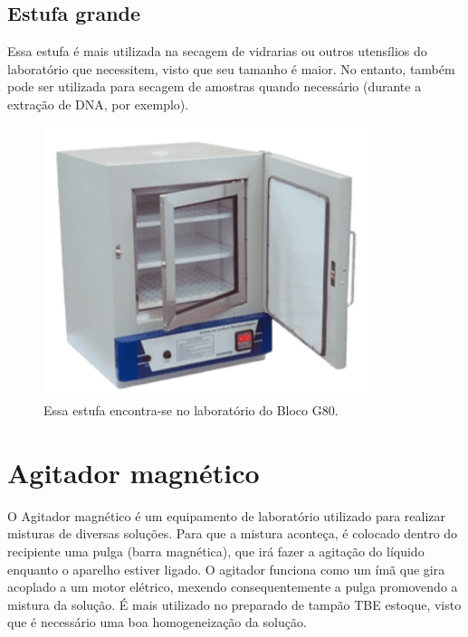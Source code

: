 \documentclass[
  letterpaper,
  DIV=11,
  numbers=noendperiod]{scrreprt}
\begin{document}
\hypertarget{estufa-grande}{%
\subsection{Estufa grande}\label{estufa-grande}}

Essa estufa é mais utilizada na secagem de vidrarias ou outros
utensílios do laboratório que necessitem, visto que seu tamanho é maior.
No entanto, também pode ser utilizada para secagem de amostras quando
necessário (durante a extração de DNA, por exemplo).

\begin{figure}

{\centering \includegraphics[width=\textwidth,height=3.125in]{figures/equipamentos/estufa_grande.png}

}

\caption{Essa estufa encontra-se no laboratório do Bloco G80.}

\end{figure}

\hypertarget{agitador-magnuxe9tico}{%
\section{Agitador magnético}\label{agitador-magnuxe9tico}}

O Agitador magnético é um equipamento de laboratório utilizado para
realizar misturas de diversas soluções. Para que a mistura aconteça, é
colocado dentro do recipiente uma pulga (barra magnética), que irá fazer
a agitação do líquido enquanto o aparelho estiver ligado. O agitador
funciona como um ímã que gira acoplado a um motor elétrico, mexendo
consequentemente a pulga promovendo a mistura da solução. É mais
utilizado no preparado de tampão TBE estoque, visto que é necessário uma
boa homogeneização da solução.
\end{document}
